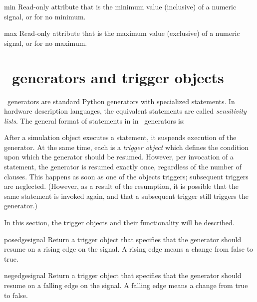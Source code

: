 \begin{memberdesc}[Signal]{min}
Read-only attribute that is the minimum value (inclusive) of a
numeric signal, or  for no minimum.
\end{memberdesc}
\begin{memberdesc}[Signal]{max}
Read-only attribute that is the maximum value
(exclusive) of a numeric signal, or  for no 
maximum.
\end{memberdesc}

\section{\myhdl\ generators and trigger objects \label{ref-gen}}

\myhdl\ generators are standard Python generators with specialized
 statements. In hardware description languages, the equivalent
statements are called 
\emph{sensitivity lists}. The general format
of  statements in in \myhdl\ generators is:

\hspace{\leftmargin} 

After a simulation object executes a  statement, it
suspends execution of the generator. At the same time, each
 is a \emph{trigger object} which defines the condition
upon which the generator should be resumed. However, per invocation of a
 statement, the generator is resumed exactly once,
regardless of the number of clauses. This happens as soon as one
of the objects triggers; subsequent triggers are
neglected. (However, as a result of the resumption, it is possible
that the same  statement is invoked again, and that a
subsequent trigger still triggers the generator.)

In this section, the trigger objects and their functionality will be
described. 

\begin{funcdesc}{posedge}{signal}
Return a trigger object that specifies that the generator should
resume on a rising edge on the signal. A rising edge means a change
from false to true.
\end{funcdesc}

\begin{funcdesc}{negedge}{signal}
Return a trigger object that specifies that the generator should
resume on a falling edge on the signal. A falling edge means a change
from true to false.
\end{funcdesc}

